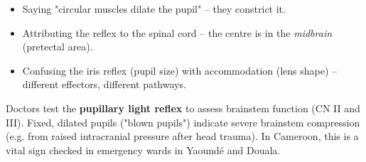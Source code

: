 \documentclass[11pt]{article}
\begin{document}
\begin{attention}
\begin{itemize}
\item Saying "circular muscles dilate the pupil" -- they constrict it.
\item Attributing the reflex to the spinal cord -- the centre is in the \emph{midbrain} (pretectal area).
\item Confusing the iris reflex (pupil size) with accommodation (lens shape) -- different effectors, different pathways.
\end{itemize}
\end{attention}

\begin{savaistu}
Doctors test the \textbf{pupillary light reflex} to assess brainstem function (CN II and III). Fixed, dilated pupils ("blown pupils") indicate severe brainstem compression (e.g. from raised intracranial pressure after head trauma). In Cameroon, this is a vital sign checked in emergency wards in Yaound\'e and Douala.
\end{savaistu}
\end{document}
